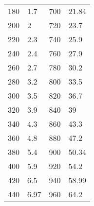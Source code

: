 \begin{table}
\begin{adjustbox}{angle=270}
{\begin{tabular}{|l|l|l|l|}
180      & 1.7                                                         & 700      & 21.84                                                        \\
200      & 2                                                           & 720      & 23.7                                                         \\
220      & 2.3                                                         & 740      & 25.9                                                         \\
240      & 2.4                                                         & 760      & 27.9                                                         \\
260      & 2.7                                                         & 780      & 30.2                                                         \\
280      & 3.2                                                         & 800      & 33.5                                                         \\
300      & 3.5                                                         & 820      & 36.7                                                         \\
320      & 3.9                                                         & 840      & 39                                                           \\
340      & 4.3                                                         & 860      & 43.3                                                         \\
360      & 4.8                                                         & 880      & 47.2                                                         \\
380      & 5.4                                                         & 900      & 50.34                                                        \\
400      & 5.9                                                         & 920      & 54.2                                                         \\
420      & 6.5                                                         & 940      & 58.99                                                        \\
440      & 6.97                                                        & 960      & 64.2                                                         \\

\end{tabular}}
\end{adjustbox}
\end{table}
